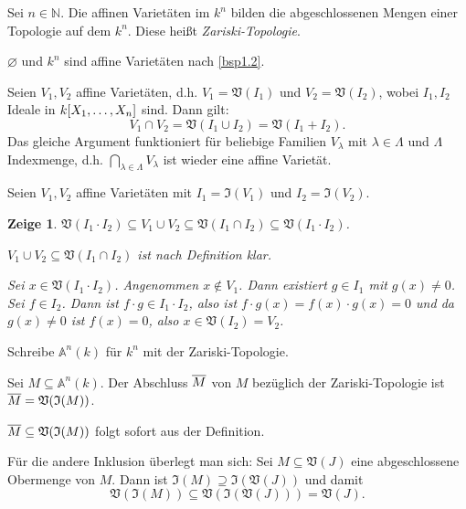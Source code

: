 \documentclass[a4paper,12pt]{scrbook}
\makeatletter
\theoremstyle{blah}
\newtheorem*{zeige}{Zeige}
\theoremstyle{stz}
\renewcommand{\proofname}{Beweis}
\renewenvironment{proof}[1][\proofname]{\par
  \pushQED{\qed}%
  \normalfont \topsep6\p@\@plus6\p@\relax
  \trivlist
  \item[\hskip\labelsep
        \itshape
    #1\@addpunct{:}]\ignorespaces
}{%
  \popQED\endtrivlist\@endpefalse
}
\def\A{\mathbb{A}}
\def\V{\mathfrak{V}}
\def\I{\mathfrak{I}}
\newcommand{\leer}{\ensuremath{\varnothing}}
\newcommand{\set}[1]{\ensuremath{\mathbb{#1}}}
\newcommand{\N}{\set{N}}
\def\Bar#1{\ensuremath\overline{#1}}
\newcommand{\polyx}[1][n]{\ensuremath%
  [X_{1},\dotsc,X_{#1}]}
\makeatother
\begin{document}
\begin{db}\label{1.2.1}Sei $n\in\N$. Die affinen Varietäten im $k^{n}$ bilden die abgeschlossenen Mengen einer Topologie auf dem $k^{n}$. Diese heißt \emph{Zariski-Topologie}.\end{db}
\begin{proof}\begin{prooflist}
\item $\leer$ und $k^{n}$ sind affine Varietäten nach \autoref{bsp1.2}.
\item Seien $V_{1},V_{2}$ affine Varietäten, d.h. $V_{1}=\V(I_{1})$ und $V_{2}=\V(I_{2})$, wobei $I_{1},I_{2}$ Ideale in $k\polyx$ sind. Dann gilt:
\[V_{1}\cap V_{2}=\V(I_{1}\cup I_{2}) = \V(I_{1}+I_{2}).\]
Das gleiche Argument funktioniert für beliebige Familien $V_{\lambda}$ mit $\lambda\in\Lambda$ und $\Lambda$ Indexmenge, d.h. $\displaystyle\bigcap_{\lambda\in\Lambda}V_{\lambda}$ ist wieder eine affine Varietät.
\item Seien $V_{1},V_{2}$ affine Varietäten mit $I_{1}=\I(V_{1})$ und $I_{2}=\I(V_{2})$.
\begin{zeige} $\V(I_{1}\cdot I_{2})\subseteq V_{1}\cup V_{2}\subseteq \V(I_{1}\cap I_{2})\subseteq \V(I_{1}\cdot I_{2})$.
\begin{prooflist}
\item $V_{1}\cup V_{2}\subseteq \V(I_{1}\cap I_{2})$ ist nach Definition klar.
\item Sei $x\in \V(I_{1}\cdot I_{2})$. Angenommen $x\notin V_{1}$. Dann existiert $g\in I_{1}$ mit $g(x)\neq 0$. Sei $f\in I_{2}$. Dann ist $f\cdot g\in I_{1}\cdot I_{2}$, also ist $f\cdot g(x) = f(x)\cdot g(x) = 0$ und da $g(x)\neq 0$ ist $f(x)=0$, also $x\in \V(I_{2})=V_{2}$.
\end{prooflist}\end{zeige}
\end{prooflist}\end{proof}

\begin{dfn}\label{1.2.2}
Schreibe $\A^{n}(k)$ für $k^{n}$ mit der Zariski-Topologie.
\end{dfn}

\begin{bem}\label{1.2.3}
Sei $M\subseteq\A^{n}(k)$. Der Abschluss $\Bar{M}$ von $M$ bezüglich der Zariski-Topologie ist $\Bar{M}=\V(\I(M))$.
\end{bem}
\begin{proof}
$\Bar{M}\subseteq \V(\I(M))$ folgt sofort aus der Definition.

Für die andere Inklusion überlegt man sich: Sei $M\subseteq\V(J)$ eine abgeschlossene Obermenge von $M$. Dann ist $\I(M)\supseteq\I(\V(J))$ und damit
\[\V(\I(M))\subseteq\V(\I(\V(J)))=\V(J).\]
\end{proof}
\end{document}
